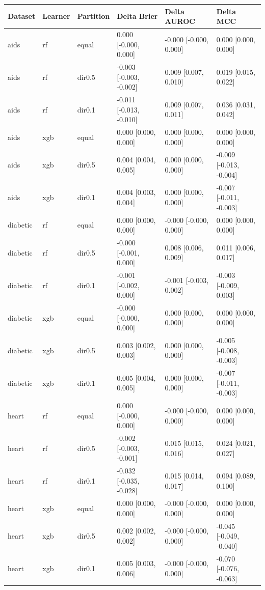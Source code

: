 \begin{tabular}{llllll}
\toprule
Dataset & Learner & Partition & Delta Brier & Delta AUROC & Delta MCC \\
\midrule
aids & rf & equal & 0.000 [-0.000, 0.000] & -0.000 [-0.000, 0.000] & 0.000 [0.000, 0.000] \\
aids & rf & dir0.5 & -0.003 [-0.003, -0.002] & 0.009 [0.007, 0.010] & 0.019 [0.015, 0.022] \\
aids & rf & dir0.1 & -0.011 [-0.013, -0.010] & 0.009 [0.007, 0.011] & 0.036 [0.031, 0.042] \\
aids & xgb & equal & 0.000 [0.000, 0.000] & 0.000 [0.000, 0.000] & 0.000 [0.000, 0.000] \\
aids & xgb & dir0.5 & 0.004 [0.004, 0.005] & 0.000 [0.000, 0.000] & -0.009 [-0.013, -0.004] \\
aids & xgb & dir0.1 & 0.004 [0.003, 0.004] & 0.000 [0.000, 0.000] & -0.007 [-0.011, -0.003] \\
\addlinespace
diabetic & rf & equal & 0.000 [0.000, 0.000] & -0.000 [-0.000, 0.000] & 0.000 [0.000, 0.000] \\
diabetic & rf & dir0.5 & -0.000 [-0.001, 0.000] & 0.008 [0.006, 0.009] & 0.011 [0.006, 0.017] \\
diabetic & rf & dir0.1 & -0.001 [-0.002, 0.000] & -0.001 [-0.003, 0.002] & -0.003 [-0.009, 0.003] \\
diabetic & xgb & equal & -0.000 [-0.000, 0.000] & 0.000 [0.000, 0.000] & 0.000 [0.000, 0.000] \\
diabetic & xgb & dir0.5 & 0.003 [0.002, 0.003] & 0.000 [0.000, 0.000] & -0.005 [-0.008, -0.003] \\
diabetic & xgb & dir0.1 & 0.005 [0.004, 0.005] & 0.000 [0.000, 0.000] & -0.007 [-0.011, -0.003] \\
\addlinespace
heart & rf & equal & 0.000 [-0.000, 0.000] & -0.000 [-0.000, 0.000] & 0.000 [0.000, 0.000] \\
heart & rf & dir0.5 & -0.002 [-0.003, -0.001] & 0.015 [0.015, 0.016] & 0.024 [0.021, 0.027] \\
heart & rf & dir0.1 & -0.032 [-0.035, -0.028] & 0.015 [0.014, 0.017] & 0.094 [0.089, 0.100] \\
heart & xgb & equal & 0.000 [0.000, 0.000] & -0.000 [-0.000, 0.000] & 0.000 [0.000, 0.000] \\
heart & xgb & dir0.5 & 0.002 [0.002, 0.002] & -0.000 [-0.000, 0.000] & -0.045 [-0.049, -0.040] \\
heart & xgb & dir0.1 & 0.005 [0.003, 0.006] & -0.000 [-0.000, 0.000] & -0.070 [-0.076, -0.063] \\
\bottomrule
\end{tabular}
